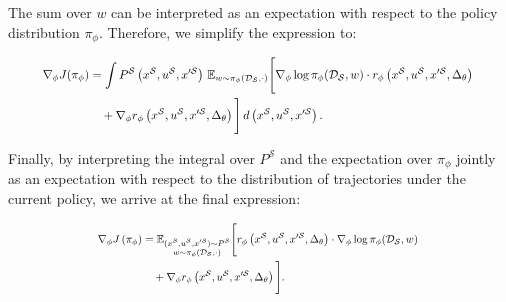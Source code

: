 The sum over \( w \) can be interpreted as an expectation with respect to the policy distribution \( \pi_{\phi} \). Therefore, we simplify the expression to:


\begin{equation}
\resizebox{0.9\hsize}{!}{%
$\displaystyle
\begin{aligned}
\nabla_{\phi} J(\pi_{\phi}) &= \int P^{\mathcal{S}}\left(x^{\mathcal{S}}, u^{\mathcal{S}}, x^{\prime \mathcal{S}}\right) \, \mathbb{E}_{w \sim \pi_{\phi}(\mathcal{D_S}, \cdot)} \Bigg[ \nabla_{\phi} \log \pi_{\phi}(\mathcal{D_S}, w) \cdot r_\phi\left(x^{\mathcal{S}}, u^{\mathcal{S}}, x^{\prime \mathcal{S}}, \Delta_\theta\right) \\
&\quad + \nabla_{\phi} r_\phi\left(x^{\mathcal{S}}, u^{\mathcal{S}}, x^{\prime \mathcal{S}}, \Delta_\theta\right) \Bigg] \, d\left(x^{\mathcal{S}}, u^{\mathcal{S}}, x^{\prime \mathcal{S}}\right).
\end{aligned}$
}
\end{equation}


Finally, by interpreting the integral over \( P^{\mathcal{S}} \) and the expectation over \( \pi_{\phi} \) jointly as an expectation with respect to the distribution of trajectories under the current policy, we arrive at the final expression:


\begin{equation}
\resizebox{0.67\hsize}{!}{%
$\displaystyle
\begin{aligned}
    \nabla_{\phi} J\left(\pi_{\phi}\right) 
    &= \mathbb{E}_{\substack{(x^{\mathcal{S}}, u^{\mathcal{S}}, x^{\prime \mathcal{S}}) \sim P^{\mathcal{S}}\\ w \sim \pi_{\phi}(\mathcal{D_S}, \cdot)}} \Bigg[ r_\phi\left(x^{\mathcal{S}}, u^{\mathcal{S}}, x^{\prime \mathcal{S}}, \Delta_\theta\right) \cdot \nabla_{\phi} \log \pi_{\phi}(\mathcal{D_S}, w) \\
    & \quad + \nabla_{\phi} r_\phi\left(x^{\mathcal{S}}, u^{\mathcal{S}}, x^{\prime \mathcal{S}}, \Delta_\theta\right) \Bigg].
\end{aligned}$
}
\end{equation}